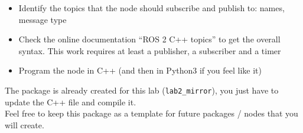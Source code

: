\documentclass{ecnreport}
\begin{document}
\begin{itemize}
\item Identify the topics that the node should subscribe and publish to: names, message type
\item Check the online documentation ``ROS 2 C++ topics'' to get the overall syntax. This work requires at least a publisher, a subscriber and a timer
\item Program the node in C++ (and then in Python3 if you feel like it)
\end{itemize}

The package is already created for this lab (\texttt{lab2\_mirror}), you just have to update the C++ file and compile it.\\
Feel free to keep this package as a template for future packages / nodes that you will create.
\end{document}
